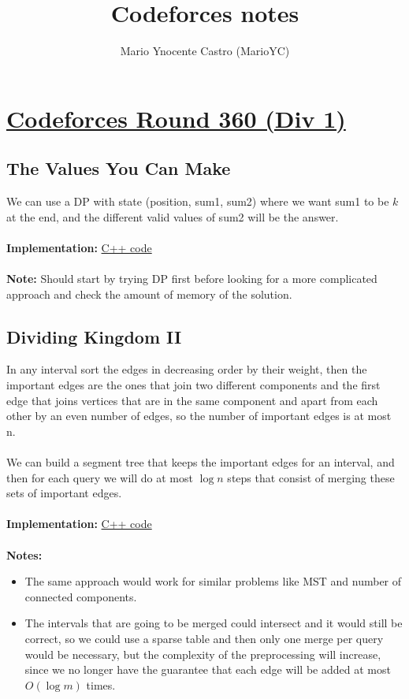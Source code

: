 \documentclass[a4paper,12pt]{article}
\title{Codeforces notes}
\author{Mario Ynocente Castro (MarioYC)}
\date{}
\begin{document}
\maketitle
\thispagestyle{empty}

\newpage
\tableofcontents

\newpage
\section{\href{http://codeforces.com/contest/687}{Codeforces Round 360 (Div 1)}}

\subsection{The Values You Can Make}

We can use a DP with state (position, sum1, sum2) where we want sum1 to be $k$ at the end, and the different valid values of sum2 will be the answer.
\\ \\
\textbf{Implementation:} \href{http://codeforces.com/contest/687/submission/19365759}{C++ code}
\\ \\
\textbf{Note:} Should start by trying DP first before looking for a more complicated approach and check the amount of memory of the solution.

\subsection{Dividing Kingdom II}

In any interval sort the edges in decreasing order by their weight, then the important edges are the ones that join two different components and the first edge that joins vertices that are in the same component and apart from each other by an even number of edges, so the number of important edges is at most n.
\\ \\
We can build a segment tree that keeps the important edges for an interval, and then for each query we will do at most $\log n$ steps that consist of merging these sets of important edges.
\\ \\
\textbf{Implementation:} \href{http://codeforces.com/contest/687/submission/19196725}{C++ code}
\\ \\
\textbf{Notes:}
\begin{itemize}
\item
The same approach would work for similar problems like MST and number of connected components.
\item
The intervals that are going to be merged could intersect and it would still be correct, so we could use a sparse table and then only one merge per query would be necessary, but the complexity of the preprocessing will increase, since we no longer have the guarantee that each edge will be added at most $O(\log m)$ times.
\end{itemize}
\end{document}
